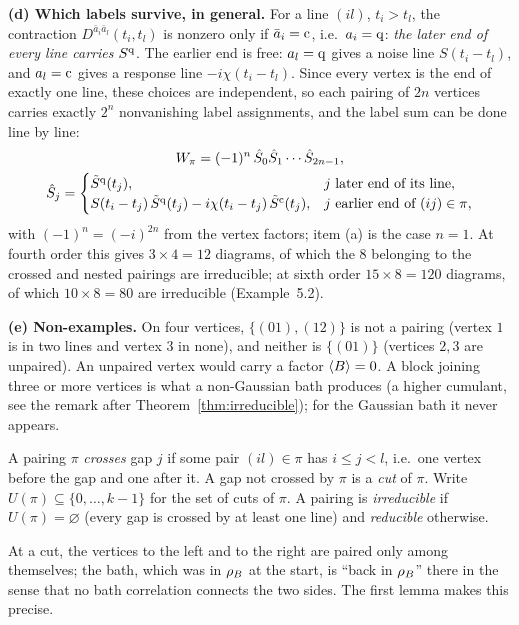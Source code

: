 \begin{exbox}
\medskip \textbf{(d) Which labels survive, in general.}
For a line $(il)$, $t_i>t_l$, the contraction $D^{\bar a_i\bar a_l}(t_i,t_l)$ is nonzero only if $\bar a_i=\mathrm{c}$, i.e.\ $a_i=\mathrm{q}$: \emph{the later end of every line carries $S^{\mathrm{q}}$}.
The earlier end is free: $a_l=\mathrm{q}$ gives a noise line $S(t_i-t_l)$, and $a_l=\mathrm{c}$ gives a response line $-i\chi(t_i-t_l)$.
Since every vertex is the end of exactly one line, these choices are independent, so each pairing of $2n$ vertices carries exactly $2^n$ nonvanishing label assignments, and the label sum can be done line by line:
\begin{gather*}
  W_\pi=(-1)^n\,\hat S_0\hat S_1\cdots\hat S_{2n-1},\\
  \hat S_j=
  \begin{cases}
    \tilde S^{\mathrm{q}}(t_j), & j\ \text{later end of its line},\\
    S(t_i-t_j)\,\tilde S^{\mathrm{q}}(t_j)-i\chi(t_i-t_j)\,\tilde S^{\mathrm{c}}(t_j), & j\ \text{earlier end of}\ (ij)\in\pi,
  \end{cases}
\end{gather*}
with $(-1)^n=(-i)^{2n}$ from the vertex factors; item (a) is the case $n=1$.
At fourth order this gives $3\times4=12$ diagrams, of which the $8$ belonging to the crossed and nested pairings are irreducible; at sixth order $15\times8=120$ diagrams, of which $10\times8=80$ are irreducible (Example~5.2).

\medskip \textbf{(e) Non-examples.}
On four vertices, $\{(01),(12)\}$ is not a pairing (vertex $1$ is in two lines and vertex $3$ in none), and neither is $\{(01)\}$ (vertices $2,3$ are unpaired).
An unpaired vertex would carry a factor $\langle B\rangle=0$.
A block joining three or more vertices is what a non-Gaussian bath produces (a higher cumulant, see the remark after Theorem~\ref{thm:irreducible}); for the Gaussian bath it never appears.
\end{exbox}

\begin{definition}\label{def:cuts}
A pairing $\pi$ \emph{crosses} gap $j$ if some pair $(il)\in\pi$ has $i\le j<l$, i.e.\ one vertex before the gap and one after it.
A gap not crossed by $\pi$ is a \emph{cut} of $\pi$.
Write $U(\pi)\subseteq\{0,\dots,k-1\}$ for the set of cuts of $\pi$.
A pairing is \emph{irreducible} if $U(\pi)=\varnothing$ (every gap is crossed by at least one line) and \emph{reducible} otherwise.
\end{definition}

At a cut, the vertices to the left and to the right are paired only among themselves; the bath, which was in $\rho_{B}$ at the start, is ``back in $\rho_{B}$'' there in the sense that no bath correlation connects the two sides.
The first lemma makes this precise.

